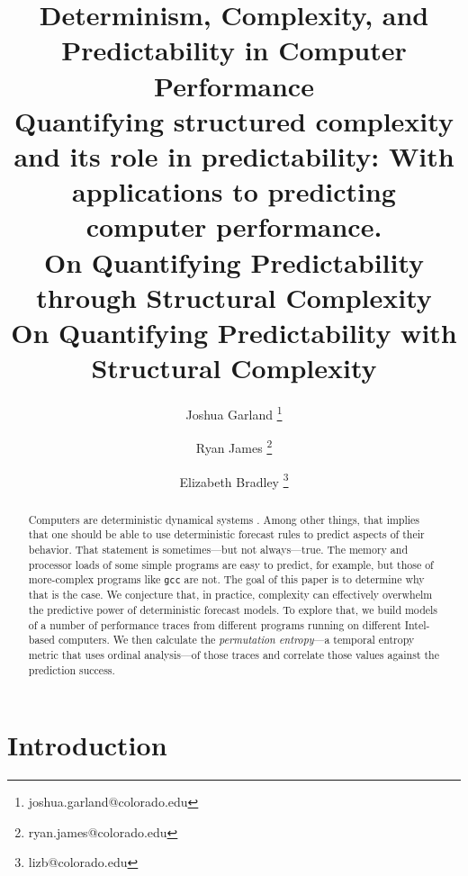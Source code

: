 \documentclass{article}
\title{Determinism, Complexity, and Predictability in Computer Performance\\
Quantifying structured complexity and its role in predictability: With applications to predicting computer performance.
\\On Quantifying Predictability through Structural Complexity
\\On Quantifying Predictability with Structural Complexity
}
\author[1]{Joshua Garland \thanks{joshua.garland@colorado.edu}}
\author[1]{Ryan James \thanks{ryan.james@colorado.edu}}
\author[1,2]{Elizabeth Bradley \thanks{lizb@colorado.edu}}
\affil[1]{Department of Computer Science\\
  University of Colorado at Boulder\\
  Colorado, USA
}
\affil[2]{Santa Fe Institute\\
  New Mexico, USA
}
\begin{document}
\maketitle





\begin{abstract}
  Computers are deterministic dynamical systems \cite{mytkowicz09}.
  Among other things, that implies that one should be able to use
  deterministic forecast rules to predict aspects of their behavior.
  That statement is sometimes---but not always---true. The memory and
  processor loads of some simple programs are easy to predict, for
  example, but those of more-complex programs like {\tt gcc} are not.
  The goal of this paper is to determine why that is the case. We
  conjecture that, in practice, complexity can effectively overwhelm
  the predictive power of deterministic forecast models. To explore
  that, we build models of a number of performance traces from
  different programs running on different Intel-based computers. We
  then calculate the \emph{permutation entropy}---a temporal entropy
  metric that uses ordinal analysis---of those traces and correlate
  those values against the prediction success.
\end{abstract}

\section{Introduction}
\end{document}
